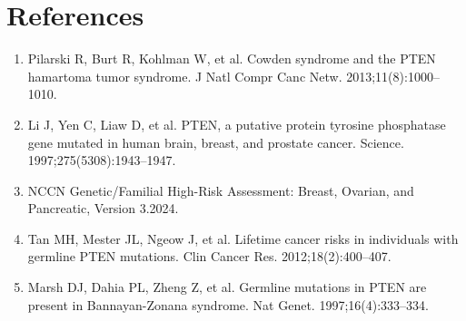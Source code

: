 \section*{References}
\begin{enumerate}
  \item Pilarski R, Burt R, Kohlman W, et al. Cowden syndrome and the PTEN hamartoma tumor syndrome. J Natl Compr Canc Netw. 2013;11(8):1000--1010.
  \item Li J, Yen C, Liaw D, et al. PTEN, a putative protein tyrosine phosphatase gene mutated in human brain, breast, and prostate cancer. Science. 1997;275(5308):1943--1947.
  \item NCCN Genetic/Familial High-Risk Assessment: Breast, Ovarian, and Pancreatic, Version 3.2024.
  \item Tan MH, Mester JL, Ngeow J, et al. Lifetime cancer risks in individuals with germline PTEN mutations. Clin Cancer Res. 2012;18(2):400--407.
  \item Marsh DJ, Dahia PL, Zheng Z, et al. Germline mutations in PTEN are present in Bannayan-Zonana syndrome. Nat Genet. 1997;16(4):333--334.
\end{enumerate}

\clearpage

